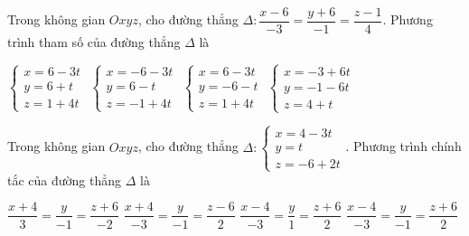 \documentclass[12pt,a4paper]{article}
\begin{document}
\begin{ex}
 Trong không gian ${Oxyz}$, cho đường thẳng ${\Delta}: \dfrac{x - 6}{-3}=\dfrac{y + 6}{-1}=\dfrac{z - 1}{4}$. Phương trình tham số của đường thẳng ${\Delta}$ là
 
\choice
{ $\left\{ \begin{array}{l}x = 6-3t\\ y = 6+t\\z = 1+4t\end{array} \right.$ }
   { $\left\{ \begin{array}{l}x = -6-3t\\ y = 6-t\\z = -1+4t\end{array} \right.$ }
     { \True $\left\{ \begin{array}{l}x = 6-3t\\ y = -6-t\\z = 1+4t\end{array} \right.$ }
    { $\left\{ \begin{array}{l}x = -3+6t\\ y = -1-6t\\z = 4+t\end{array} \right.$ }
\end{ex}

\begin{ex}
 Trong không gian ${Oxyz}$, cho đường thẳng ${\Delta}:\left\{ \begin{array}{l}x = 4-3t\\ y = t\\z = -6+2t\end{array} \right.$. Phương trình chính tắc của đường thẳng ${\Delta}$ là
 
\choice
{ $\dfrac{x + 4}{3}=\dfrac{y}{-1}=\dfrac{z + 6}{-2}$ }
   { $\dfrac{x + 4}{-3}=\dfrac{y}{-1}=\dfrac{z - 6}{2}$ }
     { $\dfrac{x - 4}{-3}=\dfrac{y}{1}=\dfrac{z + 6}{2}$ }
    { \True $\dfrac{x - 4}{-3}=\dfrac{y}{-1}=\dfrac{z + 6}{2}$ }
\end{ex}
\end{document}
